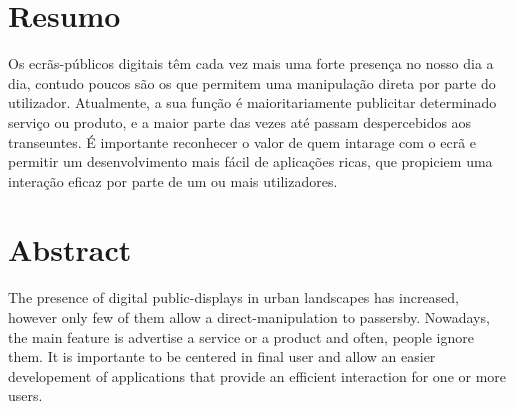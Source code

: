 \chapter*{Resumo}

Os ecrãs-públicos digitais têm cada vez mais uma forte presença no nosso dia a dia, contudo poucos são os que permitem uma manipulação direta por parte do utilizador. Atualmente, a sua função é maioritariamente publicitar determinado serviço ou produto, e a maior parte das vezes até passam despercebidos aos transeuntes.
É importante reconhecer o valor de quem intarage com o ecrã e permitir um desenvolvimento mais fácil de aplicações ricas, que propiciem uma interação eficaz por parte de um ou mais utilizadores. 

\chapter*{Abstract}

The presence of digital public-displays in urban landscapes has increased, however only few of them allow a direct-manipulation to passersby. Nowadays, the main feature is advertise a service or a product and often, people ignore them. 
It is importante to be centered in final user and allow an easier developement of applications that provide an efficient interaction for one or more users. 
